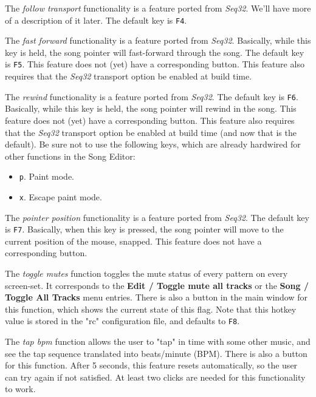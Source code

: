    The \textsl{follow transport} functionality is a feature ported
   from \textsl{Seq32}.  We'll have more of a description of it later.
   The default key is \texttt{F4}.

   The \textsl{fast forward} functionality is a feature ported
   from \textsl{Seq32}.
   Basically, while this key is held, the song pointer will fast-forward
   through the song.
   The default key is \texttt{F5}.
   This feature does not (yet) have a corresponding button.
   This feature also requires that the \textsl{Seq32} transport option be
   enabled at build time.

   The \textsl{rewind} functionality is a feature ported
   from \textsl{Seq32}.
   The default key is \texttt{F6}.
   Basically, while this key is held, the song pointer will rewind in
   the song.
   This feature does not (yet) have a corresponding button.
   This feature also requires that the \textsl{Seq32} transport option be
   enabled at build time (and now that is the default).
   Be sure not to use the following keys, which are already
   hardwired for other functions in the Song Editor:

   \begin{itemize}
      \item \texttt{p}.  Paint mode.
      \item \texttt{x}.  Escape paint mode.
   \end{itemize}

   The \textsl{pointer position} functionality is a feature ported
   from \textsl{Seq32}.
   The default key is \texttt{F7}.
   Basically, when this key is pressed, the song pointer will move to the
   current position of the mouse, snapped.
   This feature does not have a corresponding button.

   The \textsl{toggle mutes} function toggles the mute status of every
   pattern on every screen-set.  It corresponds to the
   \textbf{Edit / Toggle mute all tracks} or the 
   \textbf{Song / Toggle All Tracks}
   menu entries.  There is also a button in the main window for this function,
   which shows the current state of this flag.  Note that this
   hotkey value is stored in the "rc" configuration file, and
   defaults to \texttt{F8}.

   The \textsl{tap bpm} function allows the user to "tap" in time with some
   other music, and see the tap sequence translated into beats/minute (BPM).
   There is also a button for this function.
   After 5 seconds, this feature resets automatically, so the user can try
   again if not satisfied.  At least two clicks are needed for this
   functionality to work.

